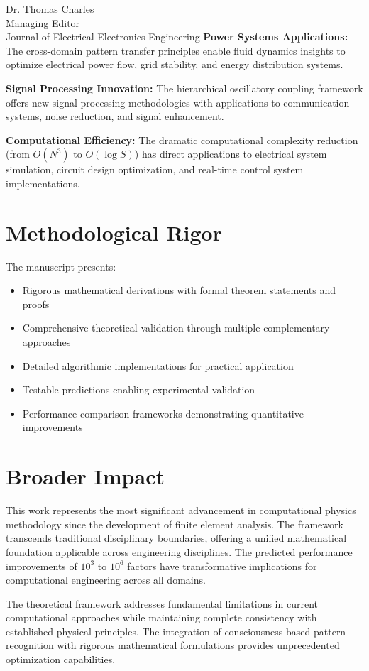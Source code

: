 \documentclass[12pt,a4paper]{letter}
\begin{document}
\begin{letter}{Dr. Thomas Charles\\
Managing Editor\\
Journal of Electrical Electronics Engineering}
\textbf{Power Systems Applications:} The cross-domain pattern transfer principles enable fluid dynamics insights to optimize electrical power flow, grid stability, and energy distribution systems.

\textbf{Signal Processing Innovation:} The hierarchical oscillatory coupling framework offers new signal processing methodologies with applications to communication systems, noise reduction, and signal enhancement.

\textbf{Computational Efficiency:} The dramatic computational complexity reduction (from $O(N^3)$ to $O(\log S)$) has direct applications to electrical system simulation, circuit design optimization, and real-time control system implementations.

\section*{Methodological Rigor}

The manuscript presents:
\begin{itemize}
\item Rigorous mathematical derivations with formal theorem statements and proofs
\item Comprehensive theoretical validation through multiple complementary approaches
\item Detailed algorithmic implementations for practical application
\item Testable predictions enabling experimental validation
\item Performance comparison frameworks demonstrating quantitative improvements
\end{itemize}

\section*{Broader Impact}

This work represents the most significant advancement in computational physics methodology since the development of finite element analysis. The framework transcends traditional disciplinary boundaries, offering a unified mathematical foundation applicable across engineering disciplines. The predicted performance improvements of $10^3$ to $10^6$ factors have transformative implications for computational engineering across all domains.

The theoretical framework addresses fundamental limitations in current computational approaches while maintaining complete consistency with established physical principles. The integration of consciousness-based pattern recognition with rigorous mathematical formulations provides unprecedented optimization capabilities.


\end{letter}
\end{document}
